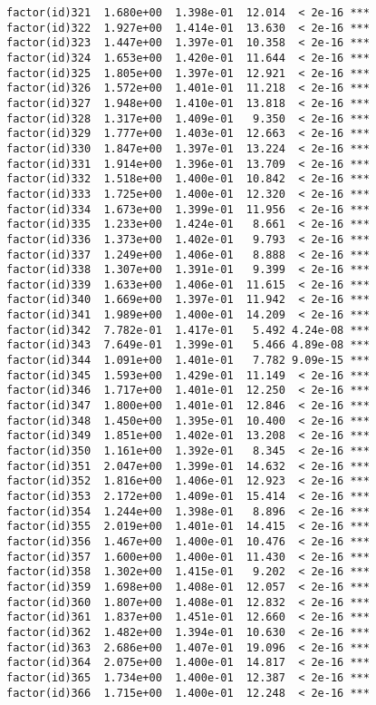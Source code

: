 \documentclass[]{article}
\begin{document}
\begin{verbatim}
factor(id)321  1.680e+00  1.398e-01  12.014  < 2e-16 ***
factor(id)322  1.927e+00  1.414e-01  13.630  < 2e-16 ***
factor(id)323  1.447e+00  1.397e-01  10.358  < 2e-16 ***
factor(id)324  1.653e+00  1.420e-01  11.644  < 2e-16 ***
factor(id)325  1.805e+00  1.397e-01  12.921  < 2e-16 ***
factor(id)326  1.572e+00  1.401e-01  11.218  < 2e-16 ***
factor(id)327  1.948e+00  1.410e-01  13.818  < 2e-16 ***
factor(id)328  1.317e+00  1.409e-01   9.350  < 2e-16 ***
factor(id)329  1.777e+00  1.403e-01  12.663  < 2e-16 ***
factor(id)330  1.847e+00  1.397e-01  13.224  < 2e-16 ***
factor(id)331  1.914e+00  1.396e-01  13.709  < 2e-16 ***
factor(id)332  1.518e+00  1.400e-01  10.842  < 2e-16 ***
factor(id)333  1.725e+00  1.400e-01  12.320  < 2e-16 ***
factor(id)334  1.673e+00  1.399e-01  11.956  < 2e-16 ***
factor(id)335  1.233e+00  1.424e-01   8.661  < 2e-16 ***
factor(id)336  1.373e+00  1.402e-01   9.793  < 2e-16 ***
factor(id)337  1.249e+00  1.406e-01   8.888  < 2e-16 ***
factor(id)338  1.307e+00  1.391e-01   9.399  < 2e-16 ***
factor(id)339  1.633e+00  1.406e-01  11.615  < 2e-16 ***
factor(id)340  1.669e+00  1.397e-01  11.942  < 2e-16 ***
factor(id)341  1.989e+00  1.400e-01  14.209  < 2e-16 ***
factor(id)342  7.782e-01  1.417e-01   5.492 4.24e-08 ***
factor(id)343  7.649e-01  1.399e-01   5.466 4.89e-08 ***
factor(id)344  1.091e+00  1.401e-01   7.782 9.09e-15 ***
factor(id)345  1.593e+00  1.429e-01  11.149  < 2e-16 ***
factor(id)346  1.717e+00  1.401e-01  12.250  < 2e-16 ***
factor(id)347  1.800e+00  1.401e-01  12.846  < 2e-16 ***
factor(id)348  1.450e+00  1.395e-01  10.400  < 2e-16 ***
factor(id)349  1.851e+00  1.402e-01  13.208  < 2e-16 ***
factor(id)350  1.161e+00  1.392e-01   8.345  < 2e-16 ***
factor(id)351  2.047e+00  1.399e-01  14.632  < 2e-16 ***
factor(id)352  1.816e+00  1.406e-01  12.923  < 2e-16 ***
factor(id)353  2.172e+00  1.409e-01  15.414  < 2e-16 ***
factor(id)354  1.244e+00  1.398e-01   8.896  < 2e-16 ***
factor(id)355  2.019e+00  1.401e-01  14.415  < 2e-16 ***
factor(id)356  1.467e+00  1.400e-01  10.476  < 2e-16 ***
factor(id)357  1.600e+00  1.400e-01  11.430  < 2e-16 ***
factor(id)358  1.302e+00  1.415e-01   9.202  < 2e-16 ***
factor(id)359  1.698e+00  1.408e-01  12.057  < 2e-16 ***
factor(id)360  1.807e+00  1.408e-01  12.832  < 2e-16 ***
factor(id)361  1.837e+00  1.451e-01  12.660  < 2e-16 ***
factor(id)362  1.482e+00  1.394e-01  10.630  < 2e-16 ***
factor(id)363  2.686e+00  1.407e-01  19.096  < 2e-16 ***
factor(id)364  2.075e+00  1.400e-01  14.817  < 2e-16 ***
factor(id)365  1.734e+00  1.400e-01  12.387  < 2e-16 ***
factor(id)366  1.715e+00  1.400e-01  12.248  < 2e-16 ***

\end{verbatim}
\end{document}
